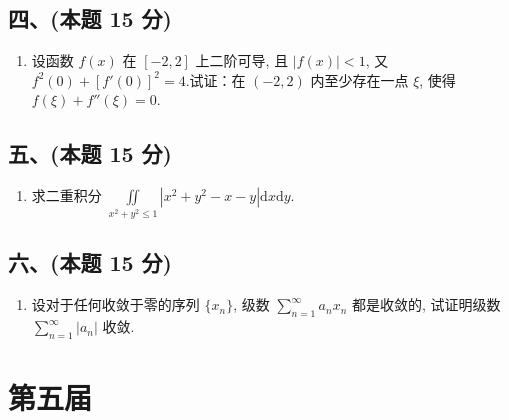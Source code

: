 \subsection*{四、(本题 15 分)}
\begin{enumerate}[start=8]
    \item 设函数 $f(x)$ 在 $[-2,2]$ 上二阶可导, 且 $|f(x)|<1$, 又 $f^2(0)+[f'(0)]^2=4$.试证：在 $(-2,2)$ 内至少存在一点 $\xi$, 使得 $f(\xi)+f''(\xi)=0$.
\end{enumerate}

\subsection*{五、(本题 15 分)}
\begin{enumerate}[start=9]
    \item 求二重积分 $\displaystyle\iint\limits_{x^2+y^2\leqslant 1}|x^2+y^2-x-y|\mathrm{d}x\mathrm{d}y$.
\end{enumerate}

\subsection*{六、(本题 15 分)}
\begin{enumerate}[start=10]
    \item 设对于任何收敛于零的序列 $\{x_n\}$, 级数 $\displaystyle\sum_{n=1}^{\infty}a_nx_n$ 都是收敛的, 试证明级数 $\displaystyle\sum_{n=1}^{\infty}|a_n|$ 收敛.
\end{enumerate}


\newpage
\section{第五届}

